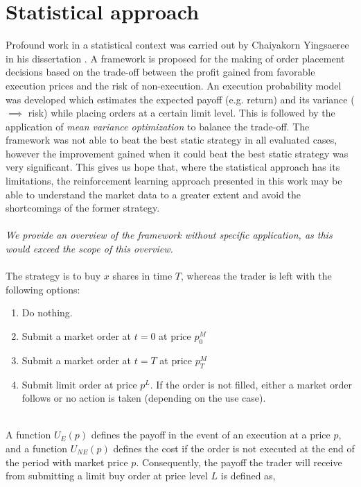 \section{Statistical approach}

Profound work in a statistical context was carried out by Chaiyakorn Yingsaeree in his dissertation \cite{yingsaeree2012algorithmic}.
A framework is proposed for the making of order placement decisions based on the trade-off between the profit gained from favorable execution prices and the risk of non-execution.
An execution probability model was developed which estimates the expected payoff (e.g. return) and its variance ($\implies$ risk) while placing orders at a certain limit level.  This is followed by the application of \textit{mean variance optimization} to balance the trade-off.
The framework was not able to beat the best static strategy in all evaluated cases, however the improvement gained when it could beat the best static strategy was very significant.
This gives us hope that, where the statistical approach has its limitations, the reinforcement learning approach presented in this work may be able to understand the market data to a greater extent and avoid the shortcomings of the former strategy.
\\
\\
\textit{We provide an overview of the framework without specific application, as this would exceed the scope of this overview.}
\\
\\
The strategy is to buy $x$ shares in time $T$, whereas the trader is left with the following options:
\begin{enumerate}
    \item Do nothing.
    \item Submit a market order at $t=0$ at price $p_{0}^M$
    \item Submit a market order at $t=T$ at price $p_{T}^M$
    \item Submit limit order at price $p^L$. If the order is not filled, either a market order follows or no action is taken (depending on the use case).
\end{enumerate}
\hfill
\\
A function $U_{E}(p)$ defines the payoff in the event of an execution at a price $p$, and a function $U_{NE}(p)$ defines the cost if the order is not executed at the end of the period with market price $p$. 
Consequently, the payoff the trader will receive from submitting a limit buy order at price level $L$ is defined as,
